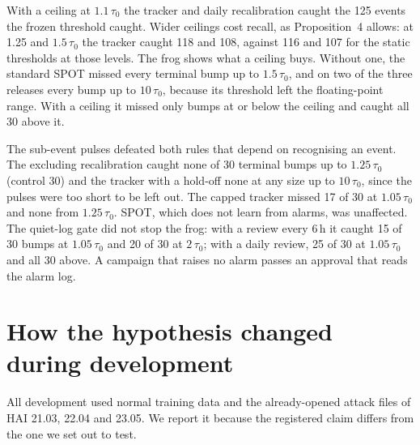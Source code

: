 \documentclass[letterpaper,twocolumn,10pt]{article}
\begin{document}
With a ceiling at $1.1\,\tau_0$ the tracker and daily recalibration caught the 125 events the frozen
threshold caught. Wider ceilings cost recall, as Proposition~4 allows: at 1.25 and $1.5\,\tau_0$ the
tracker caught 118 and 108, against 116 and 107 for the static thresholds at those levels. The frog
shows what a ceiling buys. Without one, the standard SPOT missed every terminal bump up to
$1.5\,\tau_0$, and on two of the three releases every bump up to $10\,\tau_0$, because its threshold
left the floating-point range. With a ceiling it missed only bumps at or below the ceiling and caught
all 30 above it.

The sub-event pulses defeated both rules that depend on recognising an event. The excluding
recalibration caught none of 30 terminal bumps up to $1.25\,\tau_0$ (control 30) and the tracker with
a hold-off none at any size up to $10\,\tau_0$, since the pulses were too short to be left out. The capped
tracker missed 17 of 30 at $1.05\,\tau_0$ and none from $1.25\,\tau_0$. SPOT, which does not learn
from alarms, was unaffected. The quiet-log gate did not stop the frog: with a review every 6\,h it
caught 15 of 30 bumps at $1.05\,\tau_0$ and 20 of 30 at $2\,\tau_0$; with a daily review, 25 of 30
at $1.05\,\tau_0$ and all 30 above. A campaign that raises no alarm passes an approval that reads
the alarm log.

\FloatBarrier
\section{How the hypothesis changed during development}
\label{sec:development}

All development used normal training data and the already-opened attack files of HAI 21.03, 22.04
and 23.05. We report it because the registered claim differs from the one we set out to test.
\end{document}
